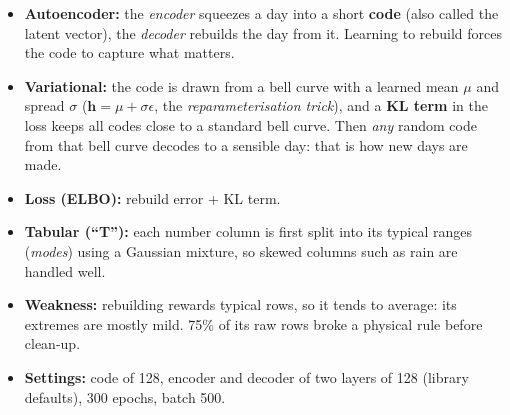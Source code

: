 \begin{itemize}
  \item \textbf{Autoencoder:} the \emph{encoder} squeezes a day into a short \textbf{code} (also called the latent
        vector), the \emph{decoder} rebuilds the day from it. Learning to rebuild forces the code to capture what
        matters.
  \item \textbf{Variational:} the code is drawn from a bell curve with a learned mean $\mu$ and spread $\sigma$
        ($\mathbf h=\mu+\sigma\epsilon$, the \emph{reparameterisation trick}), and a \textbf{KL term} in the loss keeps
        all codes close to a standard bell curve. Then \emph{any} random code from that bell curve decodes to a
        sensible day: that is how new days are made.
  \item \textbf{Loss (ELBO):} rebuild error + KL term.
  \item \textbf{Tabular (``T''):} each number column is first split into its typical ranges (\emph{modes}) using a
        Gaussian mixture, so skewed columns such as rain are handled well.
  \item \textbf{Weakness:} rebuilding rewards typical rows, so it tends to average: its extremes are mostly mild. 75\%
        of its raw rows broke a physical rule before clean-up.
  \item \textbf{Settings:} code of 128, encoder and decoder of two layers of 128 (library defaults), 300 epochs,
        batch 500.
\end{itemize}

